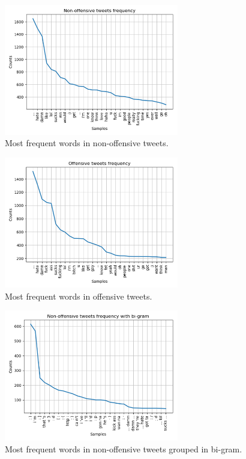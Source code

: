 \documentclass[journal]{IEEEtran}
\begin{document}
\begin{figure}[!t]
\centering
\includegraphics[width=3in]{non_offensive_tweets}
\caption{Most frequent words in non-offensive tweets.}
\label{non_off_dataset}
\end{figure}

\begin{figure}[!t]
\centering
\includegraphics[width=3in]{offensive_tweets}
\caption{Most frequent words in offensive tweets.}
\label{off_dataset}
\end{figure}


\begin{figure}[!t]
\centering
\includegraphics[width=3in]{non_offensive_tweets_bigram}
\caption{Most frequent words in non-offensive tweets grouped in bi-gram.}
\label{non_off_dataset_bigram}
\end{figure}
\end{document}
